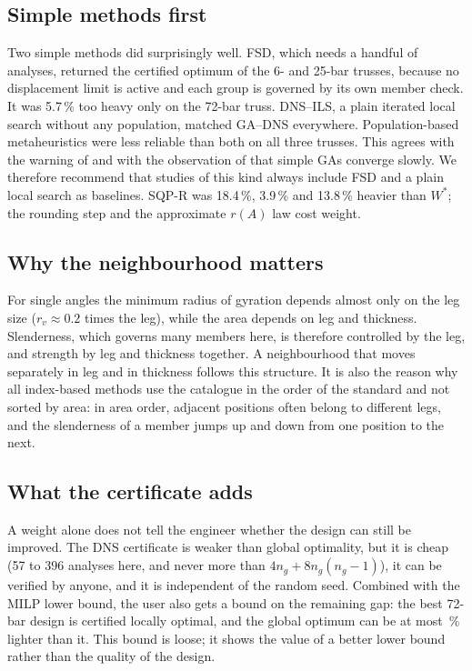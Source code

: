 \documentclass[lineno,pdflatex,sn-mathphys-num]{sn-jnl}
\begin{document}
\subsection{Simple methods first}
Two simple methods did surprisingly well. FSD, which needs a handful of
analyses, returned the certified optimum of the 6- and 25-bar trusses, because
no displacement limit is active and each group is governed by its own member
check. It was 5.7\,\% too heavy only on the 72-bar truss. DNS--ILS, a plain
iterated local search without any population, matched GA--DNS everywhere.
Population-based metaheuristics were less reliable than both on all three
trusses. This agrees with the warning of \citet{Sorensen2015} and with the
observation of \citet{Hasancebi2009} that simple GAs converge slowly. We
therefore recommend that studies of this kind always include FSD and a plain
local search as baselines. SQP-R was 18.4\,\%, 3.9\,\% and 13.8\,\% heavier
than $W^\ast$; the rounding step and the approximate $r(A)$ law cost weight.

\subsection{Why the neighbourhood matters}
For single angles the minimum radius of gyration depends almost only on the
leg size ($r_v\approx0.2$ times the leg), while the area depends on leg and
thickness. Slenderness, which governs many members here, is therefore
controlled by the leg, and strength by leg and thickness together. A
neighbourhood that moves separately in leg and in thickness follows this
structure. It is also the reason why all index-based methods use the catalogue
in the order of the standard and not sorted by area: in area order, adjacent
positions often belong to different legs, and the slenderness of a member
jumps up and down from one position to the next.

\subsection{What the certificate adds}
A weight alone does not tell the engineer whether the design can still be
improved. The DNS certificate is weaker than global optimality, but it is
cheap (57 to 396 analyses here, and never more than $4n_g+8n_g(n_g-1)$), it can
be verified by anyone, and it is independent of the random seed. Combined with
the MILP lower bound, the user also gets a bound on the remaining gap: the
best 72-bar design is certified locally optimal, and the global optimum
can be at most \GAPsvt\,\% lighter than it. This bound is loose; it shows the value
of a better lower bound rather than the quality of the design.
\end{document}
